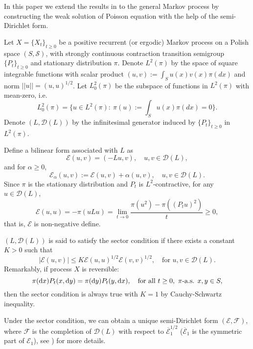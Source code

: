 \documentclass[12pt,reqno]{article}
\newcommand{\wt}{\color{magenta}}
\theoremstyle{definition}
\theoremstyle{remark}
\theoremstyle{example}
\numberwithin{equation}{section}
\newcommand{\scr}[1]{\mathscr #1}
\def\d{\mathrm{d}}
\def\e{\scr E}
\def\d{\rm d}
\def\lb{\label}
\def\rar{\rightarrow}
\def\bar{\overline}
\def\d{{\mbox{\rm d}}}
\begin{document}
In this paper we extend the results in \cite{HM21+} to the general Markov process by constructing the weak solution of Poisson equation with the help of the semi-Dirichlet form.

Let $X=\{X_t\}_{t\geq0}$ be a positive recurrent (or ergodic) Markov process on a Polish space $(S,\mathcal{S})$, with strongly continuous contraction transition semigroup $\{P_t\}_{t\geq0}$ and stationary distribution $\pi$. Denote $L^2(\pi)$ by the space of square integrable functions with scalar product
$
(u,v):=\int_S u(x)v(x)\pi(dx)
$
and norm $||u||=( u,u)^{1/2}$. Let $L^2_0(\pi)$ be the subspace of functions in $L^2(\pi)$ with mean-zero, i.e.
$$
L^2_0(\pi)=\{u\in L^2(\pi):\ \pi(u):=\int_S u(x)\pi(dx)=0\}.
$$
Denote $(L,\mathscr{D}(L))$ by the infinitesimal generator induced by $\{P_t\}_{t\geq0}$ in $L^2(\pi)$.

 Define a bilinear form associated with $L$ as
$$
\e(u,v)=( -Lu,v),\quad u,v\in\scr{D}(L),
$$
and for  $\alpha\geq0$,
$$
\e_\alpha(u,v):=\e(u,v)+\alpha(u,v),\quad u,v\in\scr{D}(L).
$$
Since $\pi$ is the stationary distribution and $P_{t}$ is $L^{2}$-contractive, for any  $u \in \mathscr{D}(L) $,
$$
\mathscr{E}(u, u)=-\pi(u L u)=\lim_{t\rar0}\frac{\pi(u^2)-\pi\left(\left(P_{t} u\right)^{2}\right)}{t}\ge0,
$$
that is, $\scr{E}$ is non-negative define.

  $(L,\mathscr{D}(L))$ is said to satisfy the sector condition if there exists a constant $K>0$ such that
\begin{equation}\label{weak-sect}
	|\e(u,v)|\leq K\e(u,u)^{1/2}\e(v,v)^{1/2},\quad \text{for  }u,v\in\scr{D}(L).
\end{equation}
Remarkably, if process $X$ is reversible:
	$$
	\pi(\d x)P_t(x,\d y)=\pi(\d y)P_t(y,\d x),\quad \text{for all }t\geq0,\ \pi\text{-a.s. }x,y\in S,
	$$
	then the sector condition is always true with $K=1$ by Cauchy-Schwartz inequality.

Under the sector condition, we can obtain a unique semi-Dirichlet form $(\e,\scr{F})$, where $\scr{F}$ is the completion of $\scr{D}(L)$ with respect to $\bar{\e}_1^{1/2}$ ($\bar{\e}_1$ is the symmetric part of $\e_1$), see \cite[Chapter 1, Theorem 2.15]{MR92}) for more details.


\end{document}

